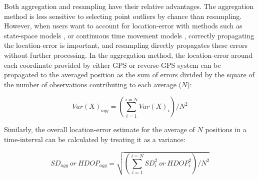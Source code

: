 \documentclass[10pt,paper=a4,headings=standardclasses
]{scrartcl}
\begin{document}
Both aggregation and resampling have their relative advantages. 
The aggregation method is less sensitive to selecting point outliers by chance than resampling.
However, when users want to account for location-error with methods such as state-space models \citep{jonsen2003, jonsen2005, johnson2008}, or continuous time movement models \citep{fleming2014a, noonan2019, gurarie2017, calabrese2016, fleming2020}, correctly propagating the location-error is important, and resampling directly propagates these errors without further processing.
In the aggregation method, the location-error around each coordinate provided by either GPS or reverse-GPS system can be propagated to the averaged position as the sum of errors divided by the square of the number of observations contributing to each average ($N$):
\begin{linenomath*}
    \begin{equation*}
        Var(X)_{agg} = \left( \sum_{i=1}^{i=N} Var(X)_i \right) / N ^ 2
    \end{equation*}
\end{linenomath*}
Similarly, the overall location-error estimate for the average of $N$ positions in a time-interval can be calculated by treating it as a variance:
\begin{linenomath*}
    \begin{equation*}
        SD_{agg} \ or \ HDOP_{agg} = \sqrt{ \left( \sum_{i=1}^{i=N} SD_i^2 \ or \ HDOP_i^2 \right) / N ^ 2  }
    \end{equation*}    
\end{linenomath*}
\end{document}
